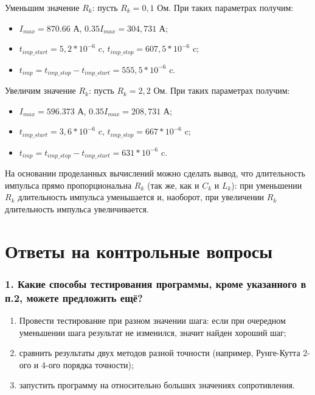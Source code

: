 Уменьшим значение $R_k$: пусть $R_k = 0,1$ Ом. При таких параметрах получим:
\begin{itemize}
	\item $I_{max} = 870.66$ А, $0.35I_{max} = 304,731$ А;
	\item $t_{imp\_start} = 5,2 * 10^{-6}$ c, $t_{imp\_stop} = 607,5 * 10^{-6}$ c;
	\item $t_{imp} = t_{imp\_stop} - t_{imp\_start} = 555,5 * 10^{-6}$ c.
\end{itemize}


Увеличим значение $R_k$: пусть $R_k = 2,2$ Ом. При таких параметрах получим:
\begin{itemize}
	\item $I_{max} = 596.373$ А, $0.35I_{max} = 208,731$ А;
	\item $t_{imp\_start} = 3,6 * 10^{-6}$ c, $t_{imp\_stop} = 667 * 10^{-6}$ c;
	\item $t_{imp} = t_{imp\_stop} - t_{imp\_start} = 631 * 10^{-6}$ c.
\end{itemize}

На основании проделанных вычислений можно сделать вывод, что длительность импульса прямо пропорциональна $R_k$ (так же, как и $C_k$ и $L_k$): при уменьшении $R_k$ длительность импульса уменьшается и, наоборот, при увеличении $R_k$ длительность импульса увеличивается.








\section*{Ответы на контрольные вопросы}


\subsubsection{1. Какие способы тестирования программы, кроме указанного в п.2, можете предложить ещё?}

\begin{enumerate}
	\item Провести тестирование при разном значении шага: если при очередном уменьшении шага результат не изменился, значит найден хороший шаг;
	\item сравнить результаты двух методов разной точности (например, Рунге-Кутта 2-ого и 4-ого порядка точности);
	\item запустить программу на относительно больших значениях сопротивления.
\end{enumerate}


